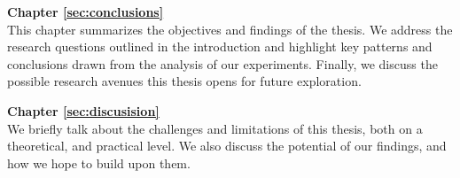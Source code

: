\textbf{Chapter \ref{sec:conclusions}} \\[0.2em]

This chapter summarizes the objectives and findings of the thesis. We address the research questions outlined in the introduction and highlight key patterns and conclusions drawn from the analysis of our experiments. Finally, we discuss the possible research avenues this thesis opens for future exploration.

\textbf{Chapter \ref{sec:discusision}} \\[0.2em]

We briefly talk about the challenges and limitations of this thesis, both on a theoretical, and practical level. We also discuss the potential of our findings, and how we hope to build upon them.
